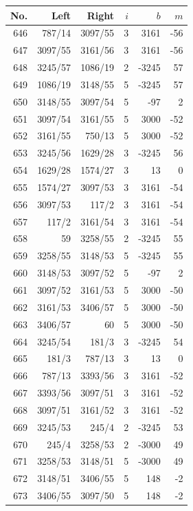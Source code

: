 \documentclass[11pt,a4paper]{article}
\begin{document}
\begin{minipage}[t]{.49\linewidth}\centering\footnotesize\setlength{\tabcolsep}{2pt}\renewcommand{\arraystretch}{1.09}
\begin{tabular*}{\linewidth}{@{}r@{\extracolsep{\fill}}rrrrr@{}}\toprule
No. & Left & Right & $i$ & $b$ & $m$\\\midrule
646 & 787/14 & 3097/55 & 3 & 3161 & -56\\
647 & 3097/55 & 3161/56 & 3 & 3161 & -56\\
648 & 3245/57 & 1086/19 & 2 & -3245 & 57\\
649 & 1086/19 & 3148/55 & 5 & -3245 & 57\\
650 & 3148/55 & 3097/54 & 5 & -97 & 2\\
651 & 3097/54 & 3161/55 & 5 & 3000 & -52\\
652 & 3161/55 & 750/13 & 5 & 3000 & -52\\
653 & 3245/56 & 1629/28 & 3 & -3245 & 56\\
654 & 1629/28 & 1574/27 & 3 & 13 & 0\\
655 & 1574/27 & 3097/53 & 3 & 3161 & -54\\
656 & 3097/53 & 117/2 & 3 & 3161 & -54\\
657 & 117/2 & 3161/54 & 3 & 3161 & -54\\
658 & 59 & 3258/55 & 2 & -3245 & 55\\
659 & 3258/55 & 3148/53 & 5 & -3245 & 55\\
660 & 3148/53 & 3097/52 & 5 & -97 & 2\\
661 & 3097/52 & 3161/53 & 5 & 3000 & -50\\
662 & 3161/53 & 3406/57 & 5 & 3000 & -50\\
663 & 3406/57 & 60 & 5 & 3000 & -50\\
664 & 3245/54 & 181/3 & 3 & -3245 & 54\\
665 & 181/3 & 787/13 & 3 & 13 & 0\\
666 & 787/13 & 3393/56 & 3 & 3161 & -52\\
667 & 3393/56 & 3097/51 & 3 & 3161 & -52\\
668 & 3097/51 & 3161/52 & 3 & 3161 & -52\\
669 & 3245/53 & 245/4 & 2 & -3245 & 53\\
670 & 245/4 & 3258/53 & 2 & -3000 & 49\\
671 & 3258/53 & 3148/51 & 5 & -3000 & 49\\
672 & 3148/51 & 3406/55 & 5 & 148 & -2\\
673 & 3406/55 & 3097/50 & 5 & 148 & -2\\

\end{tabular*}
\end{minipage}
\end{document}

